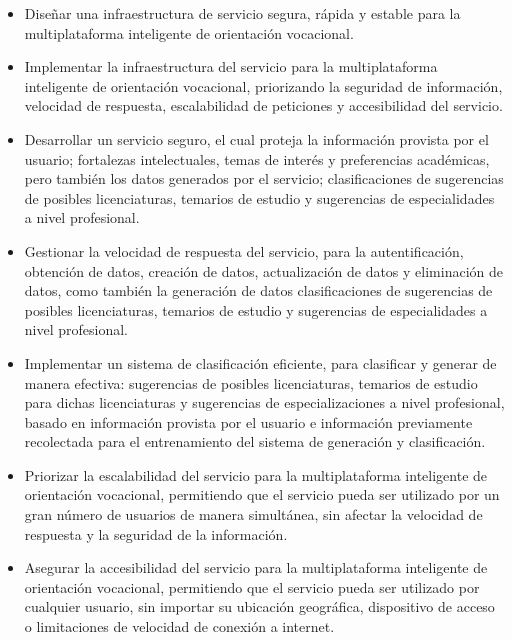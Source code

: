 \begin{itemize}
\item Diseñar una infraestructura de servicio segura, rápida y estable para la multiplataforma inteligente de orientación vocacional.
\item Implementar la infraestructura del servicio para la multiplataforma inteligente de orientación vocacional, priorizando la seguridad de información, velocidad de respuesta, escalabilidad de peticiones y accesibilidad del servicio.
\item Desarrollar un servicio seguro, el cual proteja la información provista por el usuario; fortalezas intelectuales, temas de interés y preferencias académicas, pero también los datos generados por el servicio; clasificaciones de sugerencias de posibles licenciaturas, temarios de estudio y sugerencias de especialidades a nivel profesional.
\item Gestionar la velocidad de respuesta del servicio, para la autentificación, obtención de datos, creación de datos, actualización de datos y eliminación de datos, como también la generación de datos clasificaciones de sugerencias de posibles licenciaturas, temarios de estudio y sugerencias de especialidades a nivel profesional.
\item Implementar un sistema de clasificación eficiente, para clasificar y generar de manera efectiva: sugerencias de posibles licenciaturas, temarios de estudio para dichas licenciaturas y sugerencias de especializaciones a nivel profesional, basado en información provista por el usuario e información previamente recolectada para el entrenamiento del sistema de generación y clasificación.
\item Priorizar la escalabilidad del servicio para la multiplataforma inteligente de orientación vocacional, permitiendo que el servicio pueda ser utilizado por un gran número de usuarios de manera simultánea, sin afectar la velocidad de respuesta y la seguridad de la información.
\item Asegurar la accesibilidad del servicio para la multiplataforma inteligente de orientación vocacional, permitiendo que el servicio pueda ser utilizado por cualquier usuario, sin importar su ubicación geográfica, dispositivo de acceso o limitaciones de velocidad de conexión a internet.
\end{itemize}